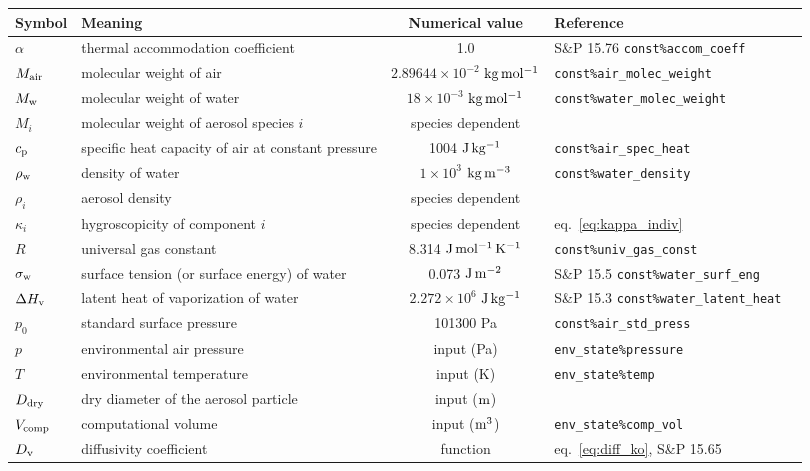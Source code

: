 \documentclass{article}
\begin{document}
\vspace{2cm}
\begin{tabular}{lp{4cm}clp{3cm}}
\hline Symbol & Meaning  & Numerical value &  Reference    \\
\hline             
$\alpha$   &  thermal accommodation coefficient    & 1.0 & S\&P 15.76  \verb+const%accom_coeff+ \\
$M_{\rm air} $      &  molecular weight of air      & $2.89644 \times 10^{-2} $  $\rm{kg \,mol^{-1}}$ &  \verb+const%air_molec_weight+   \\
$M_{\rm w} $    &  molecular weight of water        & $18\times10^{-3}$ $\rm{kg \, mol^{-1}}  $  &  \verb+const%water_molec_weight+    \\
$M_i $      &  molecular weight of aerosol species $i$  & species dependent &    \\
$c_{\rm p}$       &  specific heat capacity of air at constant pressure  & 1004 $\rm{J \, kg^{-1}}$ & \verb+const%air_spec_heat+     \\
$\rho_{\rm w}$ &  density of water & $1\times10^{3}$ $\rm{kg \, m^{-3}}  $ &   \verb+const%water_density+ \\ 
$ \rho_i$    &  aerosol density   & species dependent  &     \\
$\kappa_i$      &  hygroscopicity of component $i$   & species dependent  &  eq.~\ref{eq:kappa_indiv}   \\
$R$     &  universal gas constant  & 8.314 $\rm{J \, mol^{-1}\, K^{-1}}$   &  \verb+const%univ_gas_const+ \\
$\sigma_{\rm w}$     &  surface tension (or surface energy) of water  & 0.073 $\rm{J \, m^{-2}}$ & S\&P 15.5  \verb+const%water_surf_eng+  \\
$\Delta H_{\rm  v}$  & latent heat of vaporization of water   & $2.272\times10^{6}$ $\rm{J \, kg^{-1}}$ &  S\&P 15.3 \verb+const%water_latent_heat+ \\ 
$p_0$ & standard surface pressure &  101300 Pa & \verb+const%air_std_press+ \\
$p$     &  environmental air pressure & input  (Pa) &  \verb+env_state%pressure+ \\
$T$     &  environmental temperature  & input  (K) &  \verb+env_state%temp+  \\
$D_{\rm dry}$       & dry diameter of the aerosol particle   & input ($\rm m$) &    \\
$V_{\rm comp}$ & computational volume & input ($\rm m^3$) & \verb+env_state%comp_vol+\\
\hline
$D_{\rm v}$     & diffusivity coefficient   &  function &eq.~\ref{eq:diff_ko}, S\&P 15.65  \\

\end{tabular}
\end{document}
